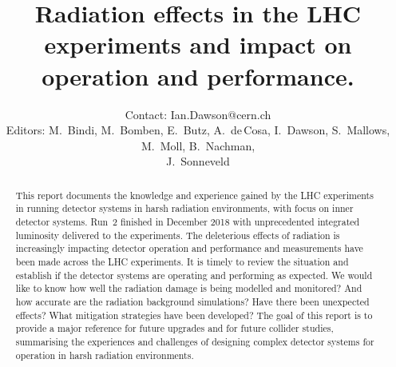 \documentclass{cernrep}
\begin{document}
\title{Radiation effects in the LHC experiments and impact on operation and performance.}

\author {Contact: Ian.Dawson@cern.ch \\
Editors: M.~Bindi, M.~Bomben, E.~Butz, A.~de\,Cosa, I.~Dawson, S.~Mallows, M.~Moll, B.~Nachman, \\
J.~Sonneveld}

\begin{abstract}
This report documents the knowledge and experience gained by the LHC experiments in running detector systems in harsh radiation environments, with focus on inner detector systems. Run~2 finished in December 2018 with unprecedented integrated luminosity delivered to the experiments. The deleterious effects of radiation is increasingly impacting detector operation and performance and measurements have been made across the LHC experiments. It is timely to review the situation and establish if the detector systems are operating and performing as expected. We would like to know how well the radiation damage is being modelled and monitored? And how accurate are the radiation background simulations? Have there been unexpected effects? What mitigation strategies have been developed? The goal of this report is to provide a major reference for future upgrades and for future collider studies, summarising the experiences and challenges of designing complex detector systems for operation in harsh radiation environments. 
\end{abstract}


\maketitle %
  
\tableofcontents











\end{document}

